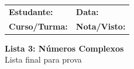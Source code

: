 \documentclass[12pt,a4paper]{article}
\begin{document}
\begin{tcolorbox}[colback=bglight, colframe=primary, boxrule=1pt, arc=3pt]
  \sffamily\small
  \begin{tabular}{@{}p{} p{}@{}}
    \textbf{Estudante:} \hrulefill & \textbf{Data:} \hrulefill \\[0.25cm]
    \textbf{Curso/Turma:} \hrulefill & \textbf{Nota/Visto:} \hrulefill
  \end{tabular}
\end{tcolorbox}

\begin{center}
  {\LARGE\bfseries\color{primary} Lista 3: Números Complexos} \\[0.1cm]
  {\small\sffamily\color{gray} Lista final para prova}
\end{center}


\vspace{0.2cm}
\end{document}
